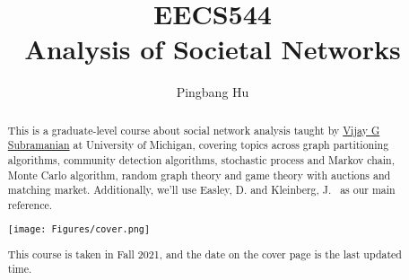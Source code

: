 \documentclass[a4paper]{report}
\author{Pingbang Hu}
\title{EECS544\\Analysis of Societal Networks}
\begin{document}
\maketitle

\begin{abstract}
	This is a graduate-level course about social network analysis taught by \href{https://subramanian.engin.umich.edu/}{Vijay G Subramanian} at University of Michigan, covering topics across graph partitioning algorithms, community detection algorithms, stochastic process and Markov chain, Monte Carlo algorithm, random graph theory and game theory with auctions and matching market. Additionally, we'll use Easley, D. and Kleinberg, J.~\cite{easley2010networks} as our main reference.

	\vfill
	\begin{center}
		\texttt{[image: Figures/cover.png]}
	\end{center}
	\vfill
	This course is taken in Fall 2021, and the date on the cover page is the last updated time.
\end{abstract}

\tableofcontents

\newpage


\newpage
\appendix
\appendixpage{}



\newpage
\printbibliography{}
\end{document}

